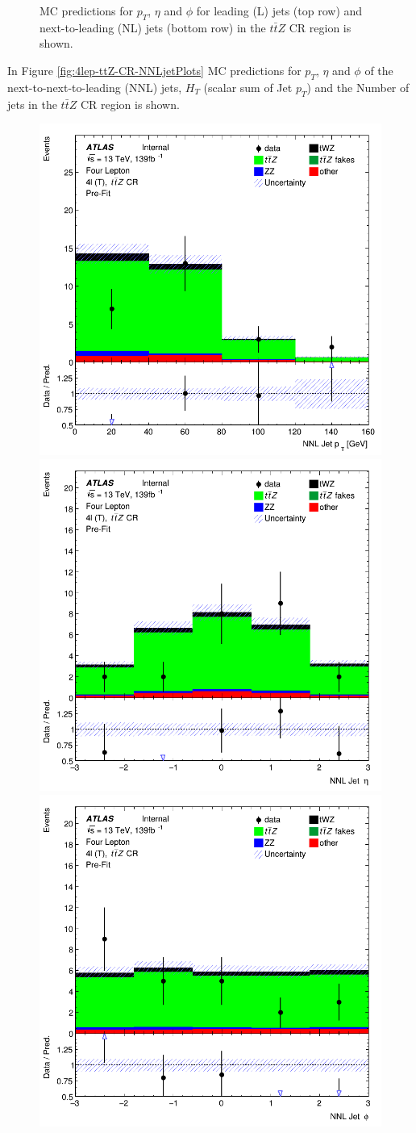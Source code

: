 \begin{figure}[htbp]
\begin{tabular}{ccc}
  \end{tabular}
    \caption{MC predictions for $p_{T}$, $\eta$ and $\phi$ for leading (L) jets (top row) and next-to-leading (NL) jets (bottom row) in the $t\bar{t}Z$ CR region  is shown.}
    \label{fig:4lep-ttZ-CR-LandNjetPlots} 
\end{figure}

In Figure \ref{fig:4lep-ttZ-CR-NNLjetPlots} MC predictions for $p_{T}$, $\eta$ and $\phi$ of the next-to-next-to-leading (NNL) jets, $H_{T}$ (scalar sum of Jet $p_{T}$) and the Number of jets in the $t\bar{t}Z$ CR region is shown.


\begin{figure}[htbp]
 \centering


    \includegraphics[width=.3\textwidth]{figures/PreFitPlots/lep4_ttZ_4T_NNLJet_pt.png} \quad
    \includegraphics[width=.3\textwidth]{figures/PreFitPlots/lep4_ttZ_4T_NNLJet_eta.png} \quad
    \includegraphics[width=.3\textwidth]{figures/PreFitPlots/lep4_ttZ_4T_NNLJet_phi.png}

    \medskip


\end{figure}
